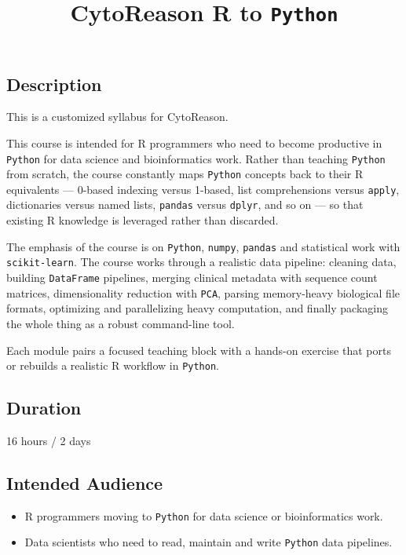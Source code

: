 \documentclass[
]{article}
\title{CytoReason R to \texttt{Python}}
\author{}
\date{}
\providecommand{\tightlist}{%
  \setlength{\itemsep}{0pt}\setlength{\parskip}{0pt}}
\begin{document}
\maketitle

\subsection{Description}\label{description}

This is a customized syllabus for CytoReason.

This course is intended for R programmers who need to become productive
in \texttt{Python} for data science and bioinformatics work. Rather than
teaching \texttt{Python} from scratch, the course constantly maps
\texttt{Python} concepts back to their R equivalents --- 0-based
indexing versus 1-based, list comprehensions versus \texttt{apply},
dictionaries versus named lists, \texttt{pandas} versus \texttt{dplyr},
and so on --- so that existing R knowledge is leveraged rather than
discarded.

The emphasis of the course is on \texttt{Python}, \texttt{numpy},
\texttt{pandas} and statistical work with \texttt{scikit-learn}. The
course works through a realistic data pipeline: cleaning data, building
\texttt{DataFrame} pipelines, merging clinical metadata with sequence
count matrices, dimensionality reduction with \texttt{PCA}, parsing
memory-heavy biological file formats, optimizing and parallelizing heavy
computation, and finally packaging the whole thing as a robust
command-line tool.

Each module pairs a focused teaching block with a hands-on exercise that
ports or rebuilds a realistic R workflow in \texttt{Python}.

\subsection{Duration}\label{duration}

16 hours / 2 days

\subsection{Intended Audience}\label{intended-audience}

\begin{itemize}
\tightlist
\item
  R programmers moving to \texttt{Python} for data science or
  bioinformatics work.
\item
  Data scientists who need to read, maintain and write \texttt{Python}
  data pipelines.
\end{itemize}
\end{document}
